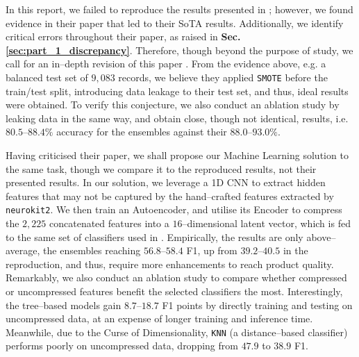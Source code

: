 \label{sec:conclusion}

In this report, we failed to reproduce the results presented in \cite{sinha2023dasmcc}; however, we found evidence in their paper that led to their SoTA results.
Additionally, we identify critical errors throughout their paper, as raised in \textbf{Sec. \ref{sec:part_1_discrepancy}}. Therefore, though beyond the purpose of study, we call for an in–depth revision of this paper \cite{sinha2023dasmcc}.
From the evidence above, e.g. a balanced test set of $9{,}083$ records, we believe they applied \texttt{SMOTE} before the train/test split, introducing data leakage to their test set, and thus, ideal results were obtained.
To verify this conjecture, we also conduct an ablation study by leaking data in the same way, and obtain close, though not identical, results, i.e. $80.5$–$88.4\%$ accuracy for the ensembles against their $88.0$–$93.0\%$.

Having criticised their paper, we shall propose our Machine Learning solution to the same task, though we compare it to the reproduced results, not their presented results.
In our solution, we leverage a 1D CNN to extract hidden features that may not be captured by the hand–crafted features extracted by \texttt{neurokit2}.
We then train an Autoencoder, and utilise its Encoder to compress the $2{,}225$ concatenated features into a $16$–dimensional latent vector, which is fed to the same set of classifiers used in \cite{sinha2023dasmcc}.
Empirically, the results are only above–average, the ensembles reaching $56.8$–$58.4$ F1, up from $39.2$–$40.5$ in the reproduction, and thus, require more enhancements to reach product quality.
Remarkably, we also conduct an ablation study to compare whether compressed or uncompressed features benefit the selected classifiers the most.
Interestingly, the tree–based models gain $8.7$–$18.7$ F1 points by directly training and testing on uncompressed data, at an expense of longer training and inference time. Meanwhile, due to the Curse of Dimensionality, \texttt{KNN} (a distance–based classifier) performs poorly on uncompressed data, dropping from $47.9$ to $38.9$ F1.
